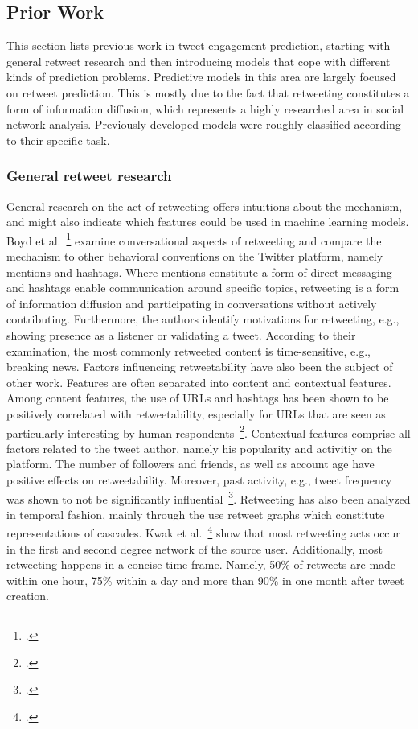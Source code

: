 \subsection{Prior Work}
\label{sec:prior_work}

This section lists previous work in tweet engagement prediction, starting with
general retweet research and then introducing models that cope with different
kinds of prediction problems.
Predictive models in this area are largely focused on retweet prediction.
This is mostly due to the fact that retweeting constitutes a form of information
diffusion, which represents a highly researched area in social network analysis.
Previously developed models were roughly classified according to their specific task.

\subsubsection{General retweet research}

General research on the act of retweeting offers intuitions about the mechanism,
and might also indicate which features could be used in machine learning models.
Boyd et al.~\footcite{Golder} examine conversational aspects of retweeting and
compare the mechanism to other behavioral conventions on the Twitter platform,
namely mentions and hashtags.
Where mentions constitute a form of direct messaging and hashtags enable
communication around specific topics, retweeting is a form of information
diffusion and participating in conversations without actively contributing.
Furthermore, the authors identify motivations for retweeting, e.g., showing
presence as a listener or validating a tweet.
According to their examination, the most commonly retweeted content is
time-sensitive, e.g., breaking news.
Factors influencing retweetability have also been the subject of other work.
Features are often separated into content and contextual features.
Among content features, the use of URLs and hashtags has been shown to be
positively correlated with retweetability, especially for URLs that are seen
as particularly interesting by human respondents~\footcite{Suh}.
Contextual features comprise all factors related to the tweet author, namely his
popularity and activitiy on the platform.
The number of followers and friends, as well as account age have positive
effects on retweetability.
Moreover, past activity, e.g., tweet frequency was shown to not be significantly
influential~\footcite{Bakshy2011, Suh}.
Retweeting has also been analyzed in temporal fashion, mainly through the use
retweet graphs which constitute representations of cascades.
Kwak et al.~\footcite{Kwak2010} show that most retweeting acts occur in the first
and second degree network of the source user.
Additionally, most retweeting happens in a concise time frame.
Namely, 50\% of retweets are made within one hour, 75\% within a day and more
than 90\% in one month after tweet creation.

